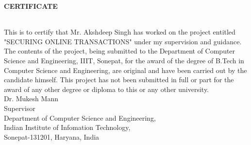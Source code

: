\documentclass[12pt, oneside, a4paper]{article}
\begin{document}
\begin{center}
    \begin{Large}\textbf{CERTIFICATE}\end{Large}
\end{center}\\
\vspace{1cm}
This is to certify that Mr. Akshdeep Singh has worked on the project entitled "SECURING ONLINE TRANSACTIONS" under my supervision and guidance.
\vspace{0.5cm}\\
The contents of the project, being submitted to the Department of Computer Science and Engineering, IIIT, Sonepat, for the award of the degree of B.Tech in Computer Science and Engineering, are original and have been carried out by the candidate himself. This project has not been submitted in full or part for the award of any other degree or diploma to this or any other university.
\vspace{4cm}\\
Dr. Mukesh Mann\\
Supervisor
\vspace{5cm}\\
Department of Computer Science and Engineering,\\
Indian Institute of Infomation Technology,\\
Sonepat-131201, Haryana, India
\pagebreak
\end{document}
